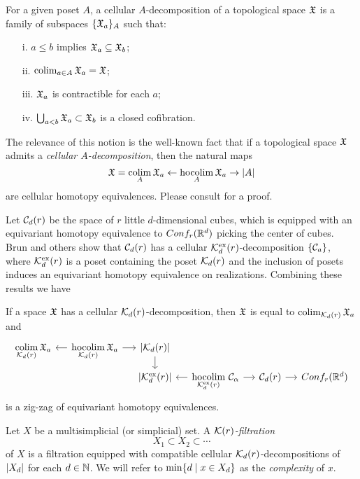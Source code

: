 \begin{definition}\label{cellulardecomposition}
	For a given poset $A$, a cellular $A$-decomposition of a topological space $\mathfrak{X}$ is a family of subspaces $\{\mathfrak{X}_a\}_A$ such that:
	\begin{itemize}
		\item [i.] $a \leq b$ implies $\mathfrak{X}_a \subseteq \mathfrak{X}_b$;
		\item [ii.]$\operatorname*{colim}_{a \in A} \mathfrak{X}_a = \mathfrak{X}$;
		\item [iii.]$\mathfrak{X}_a$ is contractible for each $a$;
		\item[iv.] $\bigcup_{a<b} \mathfrak{X}_a \subset \mathfrak{X}_b$ is a closed cofibration.
	\end{itemize}
\end{definition}

The relevance of this notion is the well-known fact that if a topological space $\mathfrak{X}$ admits a \textit{cellular $A$-decomposition}, then the natural maps
\begin{equation}\label{e:cellular poset decomposition}
	\mathfrak{X} = \operatorname*{colim}_A \mathfrak{X}_a \leftarrow \operatorname*{hocolim}_A \mathfrak{X}_a \to \lvert A\rvert
\end{equation}
are cellular homotopy equivalences.
Please consult \cite[\S1.7]{berger1997confspacemodel} for a proof.

Let $\mathcal{C}_d(r)$ be the space of $r$ little $d$-dimensional cubes, which is equipped with an equivariant homotopy equivalence to $Conf_{r}(\mathbb{R}^{d})$ picking the center of cubes.
Brun and others \cite{Brun} show that $\mathcal{C}_d(r)$ has a cellular $\mathcal{K}^{\mathrm{ex}}_d(r)$-decomposition $\{\mathcal{C}_a\}$, where $\mathcal{K}^{\mathrm{ex}}_d(r)$ is a poset containing the poset $\mathcal{K}_d(r)$ and the inclusion of posets induces an equivariant homotopy equivalence on realizations.
Combining these results we have

\begin{proposition}\label{p:zig-zag conf}
	If a space $\mathfrak{X}$ has a cellular $\mathcal{K}_d(r)$-decomposition, then $\mathfrak{X}$ is equal to $\operatorname*{colim}_{\mathcal{K}_d(r)} \mathfrak{X}_a$ and
	\begin{equation*}
		\begin{tikzcd}[column sep=small, row sep=5]
			\displaystyle \colim_{\CG_d(r)} \fX_a & \arrow[l] \displaystyle \hocolim_{\CG_d(r)} \fX_a \arrow[r] & \bars{\CG_d(r)} \arrow[d] & & \\ & &
			\bars{\CG^\ex_d(r)} & \arrow[l] \displaystyle \hocolim_{\CG^\ex_d(r)}\,\cC_\alpha \arrow[r] & \cC_d(r) \arrow[r] & \conf{r}{d}
		\end{tikzcd}
	\end{equation*}
	is a zig-zag of equivariant homotopy equivalences.
\end{proposition}

\begin{definition}
	Let $X$ be a multisimplicial (or simplicial) set.
	A \textit{$\mathcal{K}(r)$-filtration}
	\[
	X_1 \subset X_2 \subset \dotsb
	\]
	of $X$ is a filtration equipped with compatible cellular $\mathcal{K}_d(r)$-decompositions of $\lvert X_d\rvert$ for each $d \in \mathbb{N}$.
	We will refer to $\min\{d \mid x \in X_d\}$ as the \textit{complexity} of $x$.
\end{definition}